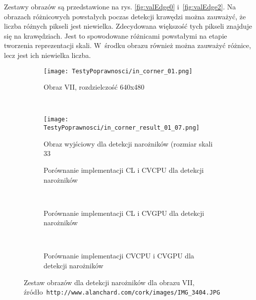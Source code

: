 Zestawy obrazów są przedstawione na rys. \ref{fig:valEdge0} i~\ref{fig:valEdge2}. Na obrazach różnicowych powstałych poczas detekcji krawędzi można zauważyć, że liczba różnych pikseli jest niewielka. Zdecydowana większość tych pikseli znajduje się na krawędziach. Jest to spowodowane różnicami powstałymi na etapie tworzenia reprezentacji skali. W~środku obrazu również można zauważyć różnice, lecz jest ich niewielka liczba.

\begin{figure}[h]

\begin{center}
\begin{subfigure}[t]{0.3\textwidth}
\texttt{[image: TestyPoprawnosci/in\_corner\_01.png]}
\caption{Obraz VII, rozdzielczość 640x480}
\label{fig:valCorner01}
\end{subfigure}
~
\begin{subfigure}[t]{0.3\textwidth}
\texttt{[image: TestyPoprawnosci/in\_corner\_result\_01\_07.png]}
\caption{Obraz wyjściowy dla detekcji narożników (rozmiar skali 33}
\label{fig:valCornerResult01}
\end{subfigure}
\end{center}

\begin{subfigure}[t]{0.3\textwidth}
	\centering
	\setlength\fboxsep{0pt}
	\setlength\fboxrule{0.5pt}
	\caption{Porównanie implementacji CL i CVCPU dla detekcji narożników}
	\label{fig:valCorner1CLCVCPU}
\end{subfigure}
~
\begin{subfigure}[t]{0.3\textwidth}
	\centering
	\setlength\fboxsep{0pt}
	\setlength\fboxrule{0.5pt}
	\caption{Porównanie implementacji CL i CVGPU dla detekcji narożników}
	\label{fig:valCorner1CLCVGPU}
\end{subfigure}
~
\begin{subfigure}[t]{0.3\textwidth}
	\centering
	\setlength\fboxsep{0pt}
	\setlength\fboxrule{0.5pt}
	\caption{Porównanie implementacji CVCPU i CVGPU dla detekcji narożników}
	\label{fig:valCorner1CVCPUCVGPU}                 
\end{subfigure}
\caption{Zestaw obrazów dla detekcji narożników dla obrazu VII, \tiny{źródło~\texttt{http://www.alanchard.com/cork/images/IMG\_3404.JPG}}}

\label{fig:valCorner1}
\end{figure}

